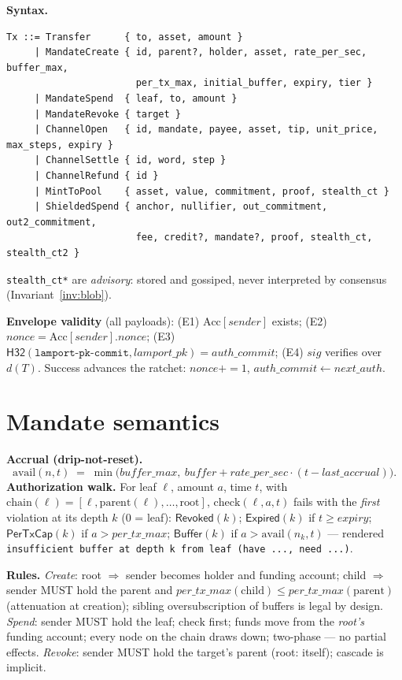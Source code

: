 \documentclass[10pt]{article}
\newcommand{\ct}[1]{\texttt{#1}}
\newcommand{\Hs}{\mathsf{H32}}
\begin{document}
\textbf{Syntax.}
\begin{lstlisting}
Tx ::= Transfer      { to, asset, amount }
     | MandateCreate { id, parent?, holder, asset, rate_per_sec, buffer_max,
                       per_tx_max, initial_buffer, expiry, tier }
     | MandateSpend  { leaf, to, amount }
     | MandateRevoke { target }
     | ChannelOpen   { id, mandate, payee, asset, tip, unit_price, max_steps, expiry }
     | ChannelSettle { id, word, step }
     | ChannelRefund { id }
     | MintToPool    { asset, value, commitment, proof, stealth_ct }
     | ShieldedSpend { anchor, nullifier, out_commitment, out2_commitment,
                       fee, credit?, mandate?, proof, stealth_ct, stealth_ct2 }
\end{lstlisting}
\ct{stealth\_ct*} are \emph{advisory}: stored and gossiped, never interpreted by consensus (Invariant~\ref{inv:blob}).

\textbf{Envelope validity} (all payloads): (E1) $\mathrm{Acc}[\mathit{sender}]$ exists; (E2) $\mathit{nonce} = \mathrm{Acc}[\mathit{sender}].\mathit{nonce}$; (E3) $\Hs(\ct{lamport-pk-commit}, \mathit{lamport\_pk}) = \mathit{auth\_commit}$; (E4) $\mathit{sig}$ verifies over $d(T)$. Success advances the ratchet: $\mathit{nonce}{+}{=}1$, $\mathit{auth\_commit} \leftarrow \mathit{next\_auth}$.

\section{Mandate semantics}
\textbf{Accrual (drip-not-reset).}
\[ \mathrm{avail}(n, t) \;=\; \min\big(\mathit{buffer\_max},\ \mathit{buffer} + \mathit{rate\_per\_sec}\cdot(t - \mathit{last\_accrual})\big). \]
\textbf{Authorization walk.} For leaf $\ell$, amount $a$, time $t$, with $\mathrm{chain}(\ell) = [\ell, \mathrm{parent}(\ell), \ldots, \mathrm{root}]$, $\mathrm{check}(\ell,a,t)$ fails with the \emph{first} violation at its depth $k$ (0 = leaf): $\mathsf{Revoked}(k)$; $\mathsf{Expired}(k)$ if $t \ge \mathit{expiry}$; $\mathsf{PerTxCap}(k)$ if $a > \mathit{per\_tx\_max}$; $\mathsf{Buffer}(k)$ if $a > \mathrm{avail}(n_k, t)$ --- rendered \ct{insufficient buffer at depth k from leaf (have ..., need ...)}.

\textbf{Rules.} \emph{Create}: root $\Rightarrow$ sender becomes holder and funding account; child $\Rightarrow$ sender MUST hold the parent and $\mathit{per\_tx\_max}(\mathrm{child}) \le \mathit{per\_tx\_max}(\mathrm{parent})$ (attenuation at creation); sibling oversubscription of buffers is legal by design. \emph{Spend}: sender MUST hold the leaf; $\mathrm{check}$ first; funds move from the \emph{root's} funding account; every node on the chain draws down; two-phase --- no partial effects. \emph{Revoke}: sender MUST hold the target's parent (root: itself); cascade is implicit.
\end{document}
